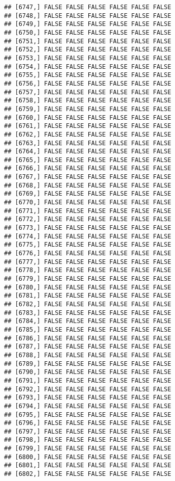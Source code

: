 \documentclass[
]{article}
\begin{document}
\begin{verbatim}
## [6747,] FALSE FALSE FALSE FALSE FALSE FALSE
## [6748,] FALSE FALSE FALSE FALSE FALSE FALSE
## [6749,] FALSE FALSE FALSE FALSE FALSE FALSE
## [6750,] FALSE FALSE FALSE FALSE FALSE FALSE
## [6751,] FALSE FALSE FALSE FALSE FALSE FALSE
## [6752,] FALSE FALSE FALSE FALSE FALSE FALSE
## [6753,] FALSE FALSE FALSE FALSE FALSE FALSE
## [6754,] FALSE FALSE FALSE FALSE FALSE FALSE
## [6755,] FALSE FALSE FALSE FALSE FALSE FALSE
## [6756,] FALSE FALSE FALSE FALSE FALSE FALSE
## [6757,] FALSE FALSE FALSE FALSE FALSE FALSE
## [6758,] FALSE FALSE FALSE FALSE FALSE FALSE
## [6759,] FALSE FALSE FALSE FALSE FALSE FALSE
## [6760,] FALSE FALSE FALSE FALSE FALSE FALSE
## [6761,] FALSE FALSE FALSE FALSE FALSE FALSE
## [6762,] FALSE FALSE FALSE FALSE FALSE FALSE
## [6763,] FALSE FALSE FALSE FALSE FALSE FALSE
## [6764,] FALSE FALSE FALSE FALSE FALSE FALSE
## [6765,] FALSE FALSE FALSE FALSE FALSE FALSE
## [6766,] FALSE FALSE FALSE FALSE FALSE FALSE
## [6767,] FALSE FALSE FALSE FALSE FALSE FALSE
## [6768,] FALSE FALSE FALSE FALSE FALSE FALSE
## [6769,] FALSE FALSE FALSE FALSE FALSE FALSE
## [6770,] FALSE FALSE FALSE FALSE FALSE FALSE
## [6771,] FALSE FALSE FALSE FALSE FALSE FALSE
## [6772,] FALSE FALSE FALSE FALSE FALSE FALSE
## [6773,] FALSE FALSE FALSE FALSE FALSE FALSE
## [6774,] FALSE FALSE FALSE FALSE FALSE FALSE
## [6775,] FALSE FALSE FALSE FALSE FALSE FALSE
## [6776,] FALSE FALSE FALSE FALSE FALSE FALSE
## [6777,] FALSE FALSE FALSE FALSE FALSE FALSE
## [6778,] FALSE FALSE FALSE FALSE FALSE FALSE
## [6779,] FALSE FALSE FALSE FALSE FALSE FALSE
## [6780,] FALSE FALSE FALSE FALSE FALSE FALSE
## [6781,] FALSE FALSE FALSE FALSE FALSE FALSE
## [6782,] FALSE FALSE FALSE FALSE FALSE FALSE
## [6783,] FALSE FALSE FALSE FALSE FALSE FALSE
## [6784,] FALSE FALSE FALSE FALSE FALSE FALSE
## [6785,] FALSE FALSE FALSE FALSE FALSE FALSE
## [6786,] FALSE FALSE FALSE FALSE FALSE FALSE
## [6787,] FALSE FALSE FALSE FALSE FALSE FALSE
## [6788,] FALSE FALSE FALSE FALSE FALSE FALSE
## [6789,] FALSE FALSE FALSE FALSE FALSE FALSE
## [6790,] FALSE FALSE FALSE FALSE FALSE FALSE
## [6791,] FALSE FALSE FALSE FALSE FALSE FALSE
## [6792,] FALSE FALSE FALSE FALSE FALSE FALSE
## [6793,] FALSE FALSE FALSE FALSE FALSE FALSE
## [6794,] FALSE FALSE FALSE FALSE FALSE FALSE
## [6795,] FALSE FALSE FALSE FALSE FALSE FALSE
## [6796,] FALSE FALSE FALSE FALSE FALSE FALSE
## [6797,] FALSE FALSE FALSE FALSE FALSE FALSE
## [6798,] FALSE FALSE FALSE FALSE FALSE FALSE
## [6799,] FALSE FALSE FALSE FALSE FALSE FALSE
## [6800,] FALSE FALSE FALSE FALSE FALSE FALSE
## [6801,] FALSE FALSE FALSE FALSE FALSE FALSE
## [6802,] FALSE FALSE FALSE FALSE FALSE FALSE

\end{verbatim}
\end{document}
